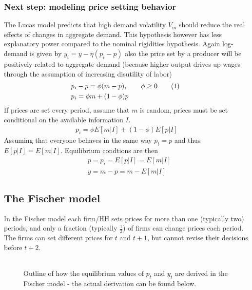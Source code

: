 \documentclass[12pt, a4paper]{article}
\begin{document}
\begin{spacing}{1.213}
\subsubsection{Next step: modeling price setting behavior}
The Lucas model predicts that high demand volatility $V_m$ should reduce the real effects of changes in aggregate demand. This hypothesis however has less explanatory power compared to the nominal rigidities hypothesis. Again log-demand is given by $y_i = y - \eta(p_i - p)$ also the price set by a producer will be positively related to aggregate demand (because higher output drives up wages through the assumption of increasing disutility of labor)
\begin{align*}
&p_i - p = \phi(m - p), \qquad \phi \geq 0 
  \stepcounter{equation}\tag{\theequation}\label{eq: phiandy}\ 
\\
& p_i = \phi m + (1-\phi) p
\end{align*}
If prices are set every period, assume that $m$ is random, prices must be set conditional on the available information $I$. 
\begin{align*}
p_i = \phi E[m|I] + (1-\phi) E[p|I]
\end{align*}
Assuming that everyone behaves in the same way $p_i = p$ and thus $E[p|I]= E[m|I]$. Equilibrium condtions are then 
\begin{align*}
&p = p_i = E[p|I] = E[m|I] \\
& y = m-p = m- E[m|I]
\end{align*}
\subsection{The Fischer model}
In the Fischer model each firm/HH sets prices for more than one (typically two) periods, and only a fraction (typically $\frac{1}{2}$) of firms can change prices each period. The firms can set different prices for $t$ and $t+1$, but cannot revise their decisions before $t+2$.

\begin{figure}[h]
\caption{}
\centering
\begin{minipage}{0.8\textwidth} %
\def\svgwidth{\columnwidth}

{\footnotesize 
\\
Outline of how the equilibrium values of $p_t$ and $y_t$ are derived in the Fischer model - the actual derivation can be found below.
\par}
\end{minipage}
\end{figure}
\FloatBarrier


\end{spacing}
\end{document}
